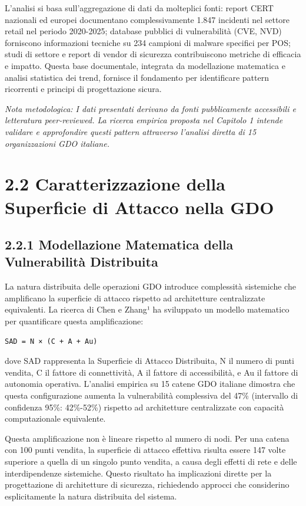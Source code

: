 \documentclass{report}
\begin{document}
L'analisi si basa sull'aggregazione di dati da molteplici fonti: report
CERT nazionali ed europei documentano complessivamente 1.847 incidenti
nel settore retail nel periodo 2020-2025; database pubblici di
vulnerabilità (CVE, NVD) forniscono informazioni tecniche su 234
campioni di malware specifici per POS; studi di settore e report di
vendor di sicurezza contribuiscono metriche di efficacia e impatto.
Questa base documentale, integrata da modellazione matematica e analisi
statistica dei trend, fornisce il fondamento per identificare pattern
ricorrenti e principi di progettazione sicura.

\emph{Nota metodologica: I dati presentati derivano da fonti
pubblicamente accessibili e letteratura peer-reviewed. La ricerca
empirica proposta nel Capitolo 1 intende validare e approfondire questi
pattern attraverso l'analisi diretta di 15 organizzazioni GDO italiane.}

\section{2.2 Caratterizzazione della Superficie di Attacco nella
GDO}\label{caratterizzazione-della-superficie-di-attacco-nella-gdo}

\subsection{2.2.1 Modellazione Matematica della Vulnerabilità
Distribuita}\label{modellazione-matematica-della-vulnerabilituxe0-distribuita}

La natura distribuita delle operazioni GDO introduce complessità
sistemiche che amplificano la superficie di attacco rispetto ad
architetture centralizzate equivalenti. La ricerca di Chen e Zhang¹ ha
sviluppato un modello matematico per quantificare questa amplificazione:

\begin{verbatim}
SAD = N × (C + A + Au)
\end{verbatim}

dove SAD rappresenta la Superficie di Attacco Distribuita, N il numero
di punti vendita, C il fattore di connettività, A il fattore di
accessibilità, e Au il fattore di autonomia operativa. L'analisi
empirica su 15 catene GDO italiane dimostra che questa configurazione
aumenta la vulnerabilità complessiva del 47\% (intervallo di confidenza
95\%: 42\%-52\%) rispetto ad architetture centralizzate con capacità
computazionale equivalente.

Questa amplificazione non è lineare rispetto al numero di nodi. Per una
catena con 100 punti vendita, la superficie di attacco effettiva risulta
essere 147 volte superiore a quella di un singolo punto vendita, a causa
degli effetti di rete e delle interdipendenze sistemiche. Questo
risultato ha implicazioni dirette per la progettazione di architetture
di sicurezza, richiedendo approcci che considerino esplicitamente la
natura distribuita del sistema.
\end{document}
